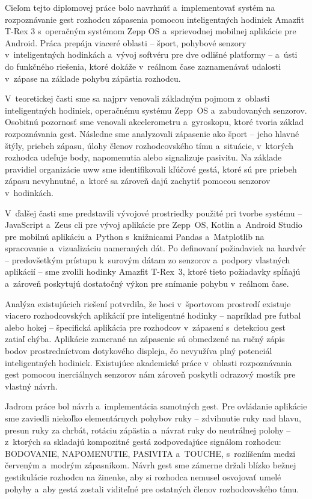 Cieľom tejto diplomovej práce bolo navrhnúť a~implementovať
systém na rozpoznávanie gest rozhodcu zápasenia pomocou
inteligentných hodiniek Amazfit T-Rex 3 s~operačným systémom
Zepp OS a~sprievodnej mobilnej aplikácie pre Android. Práca
prepája viaceré oblasti -- šport, pohybové senzory
v~inteligentných hodinkách a~vývoj softvéru pre dve odlišné
platformy -- a~ústi do funkčného riešenia, ktoré dokáže
v~reálnom čase zaznamenávať udalosti v~zápase na základe
pohybu zápästia rozhodcu.

V~teoretickej časti sme sa najprv venovali základným pojmom
z~oblasti inteligentných hodiniek, operačnému systému Zepp~OS
a~zabudovaných senzorov. Osobitnú pozornosť sme venovali
akcelerometru a~gyroskopu, ktoré tvoria základ rozpoznávania
gest. Následne sme analyzovali zápasenie ako šport -- jeho
hlavné štýly, priebeh zápasu, úlohy členov rozhodcovského
tímu a~situácie, v~ktorých rozhodca udeľuje body, napomenutia
alebo signalizuje pasivitu. Na základe pravidiel organizácie
\Gls{uww} sme identifikovali kľúčové gestá, ktoré sú pre
priebeh zápasu nevyhnutné, a~ktoré sa zároveň dajú zachytiť
pomocou senzorov v~hodinkách.

V~ďalšej časti sme predstavili vývojové prostriedky použité
pri tvorbe systému -- JavaScript a~Zeus \Gls{cli} pre vývoj
aplikácie pre Zepp~OS, Kotlin a~Android Studio pre mobilnú
aplikáciu a~Python s~knižnicami Pandas a~Matplotlib na
spracovanie a~vizualizáciu nameraných dát. Po definovaní
požiadaviek na hardvér -- predovšetkým prístupu k~surovým
dátam zo senzorov a~podpory vlastných aplikácií -- sme zvolili
hodinky Amazfit T-Rex~3, ktoré tieto požiadavky spĺňajú
a~zároveň poskytujú dostatočný výkon pre snímanie pohybu
v~reálnom čase.

Analýza existujúcich riešení potvrdila, že hoci v~športovom
prostredí existuje viacero rozhodcovských aplikácií pre inteligentné
hodinky -- napríklad pre futbal alebo hokej -- špecifická
aplikácia pre rozhodcov v~zápasení s~detekciou gest zatiaľ
chýba. Aplikácie zamerané na zápasenie sú obmedzené na ručný
zápis bodov prostredníctvom dotykového displeja, čo nevyužíva
plný potenciál inteligentných hodiniek. Existujúce akademické
práce v~oblasti rozpoznávania gest pomocou inerciálnych
senzorov nám zároveň poskytli odrazový mostík pre vlastný
návrh.

Jadrom práce bol návrh a~implementácia samotných gest. Pre
ovládanie aplikácie sme zaviedli niekoľko elementárnych
pohybov ruky -- zdvihnutie ruky nad hlavu, presun ruky za
chrbát, rotáciu zápästia a~návrat ruky do neutrálnej polohy
-- z~ktorých sa skladajú kompozitné gestá zodpovedajúce
signálom rozhodcu: BODOVANIE, NAPOMENUTIE, PASIVITA
a~TOUCHE, s~rozlíšením medzi červeným a~modrým zápasníkom.
Návrh gest sme zámerne držali blízko bežnej gestikulácie
rozhodcu na žinenke, aby si rozhodca nemusel osvojovať umelé
pohyby a~aby gestá zostali viditeľné pre ostatných členov
rozhodcovského tímu.

